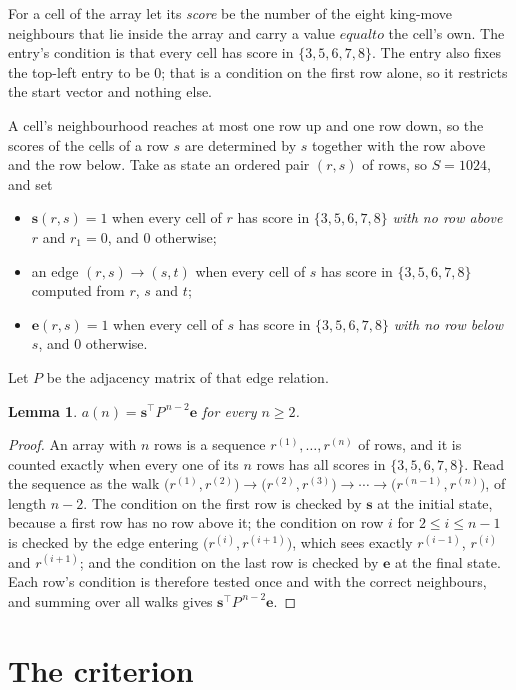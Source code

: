 \documentclass[11pt,a4paper]{article}
\theoremstyle{plain}
\newtheorem{lemma}[theorem]{Lemma}
\theoremstyle{definition}
\begin{document}
For a cell of the array let its \emph{score} be the number of the eight king-move neighbours that lie inside
the array and carry a value $equal to$ the cell's own. The entry's condition is that every cell
has score in $\{3,5,6,7,8\}$. The entry also fixes the top-left entry to be $0$; that is a condition on the first row alone, so it restricts the start vector and nothing else.

A cell's neighbourhood reaches at most one row up and one row down, so the scores of the
cells of a row $s$ are determined by $s$ together with the row above and the row below.
Take as state an ordered pair $(r,s)$ of rows, so $S=1024$, and set
\begin{itemize}
\item $\mathbf{s}(r,s)=1$ when every cell of $r$ has score in $\{3,5,6,7,8\}$ \emph{with no row
above $r$} and $r_1=0$, and $0$ otherwise;
\item an edge $(r,s)\to(s,t)$ when every cell of $s$ has score in $\{3,5,6,7,8\}$ computed from
$r$, $s$ and $t$;
\item $\mathbf{e}(r,s)=1$ when every cell of $s$ has score in $\{3,5,6,7,8\}$ \emph{with no row
below $s$}, and $0$ otherwise.
\end{itemize}
Let $P$ be the adjacency matrix of that edge relation.

\begin{lemma}\label{lem:walk}
$a(n)=\mathbf{s}^{\!\top}P^{\,n-2}\mathbf{e}$ for every $n\ge2$.
\end{lemma}

\begin{proof}
An array with $n$ rows is a sequence $r^{(1)},\dots,r^{(n)}$ of rows, and it is counted
exactly when every one of its $n$ rows has all scores in $\{3,5,6,7,8\}$. Read the sequence as the
walk $\bigl(r^{(1)},r^{(2)}\bigr)\to\bigl(r^{(2)},r^{(3)}\bigr)\to\cdots\to
\bigl(r^{(n-1)},r^{(n)}\bigr)$, of length $n-2$. The condition on the first row is
checked by $\mathbf{s}$ at the initial state, because a first row has no row above it; the
condition on row $i$ for $2\le i\le n-1$ is checked by the edge entering
$\bigl(r^{(i)},r^{(i+1)}\bigr)$, which sees exactly $r^{(i-1)}$, $r^{(i)}$ and
$r^{(i+1)}$; and the condition on the last row is checked by $\mathbf{e}$ at the final
state. Each row's condition is therefore tested once and with the correct neighbours, and
summing over all walks gives $\mathbf{s}^{\!\top}P^{\,n-2}\mathbf{e}$.
\end{proof}

\section{The criterion}
\end{document}
